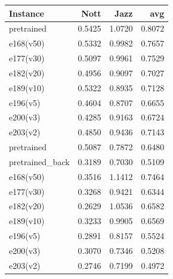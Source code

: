\begin{tabular}{lrrr}
\toprule
Instance & Nott & Jazz & avg \\
\midrule
pretrained & 0.5425 & 1.0720 & 0.8072 \\
e168(v50) & 0.5332 & 0.9982 & 0.7657 \\
e177(v30) & 0.5097 & 0.9961 & 0.7529 \\
e182(v20) & 0.4956 & 0.9097 & 0.7027 \\
e189(v10) & 0.5322 & 0.8935 & 0.7128 \\
e196(v5) & 0.4604 & 0.8707 & 0.6655 \\
e200(v3) & 0.4285 & 0.9163 & 0.6724 \\
e203(v2) & 0.4850 & 0.9436 & 0.7143 \\
pretrained & 0.5087 & 0.7872 & 0.6480 \\
pretrained_back & 0.3189 & 0.7030 & 0.5109 \\
e168(v50) & 0.3516 & 1.1412 & 0.7464 \\
e177(v30) & 0.3268 & 0.9421 & 0.6344 \\
e182(v20) & 0.2629 & 1.0536 & 0.6582 \\
e189(v10) & 0.3233 & 0.9905 & 0.6569 \\
e196(v5) & 0.2891 & 0.8157 & 0.5524 \\
e200(v3) & 0.3070 & 0.7346 & 0.5208 \\
e203(v2) & 0.2746 & 0.7199 & 0.4972 \\
\bottomrule
\end{tabular}

